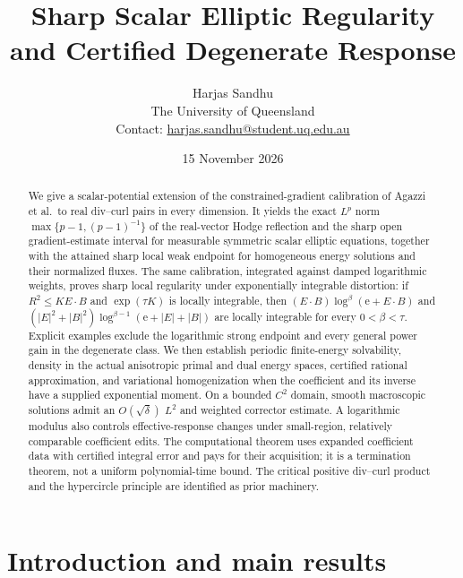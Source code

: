 \documentclass[11pt,a4paper]{article}
\numberwithin{equation}{section}
\theoremstyle{definition}
\theoremstyle{remark}\newtheorem{remark}[theorem]{Remark}
\begin{document}
\title{Sharp Scalar Elliptic Regularity\\and Certified Degenerate Response}
\author{Harjas Sandhu\\[3pt]
\small The University of Queensland\\
\small Contact:
\href{mailto:harjas.sandhu@student.uq.edu.au}{harjas.sandhu@student.uq.edu.au}}
\date{15 November 2026}
\maketitle
\begin{abstract}
We give a scalar-potential extension of the constrained-gradient calibration
of Agazzi et al.\ to real div--curl pairs in every dimension. It yields the
exact \(L^p\) norm \(\max\{p-1,(p-1)^{-1}\}\) of the real-vector Hodge
reflection and the sharp open gradient-estimate interval for measurable
symmetric scalar elliptic equations, together with the attained sharp
local weak endpoint for homogeneous energy solutions and their normalized
fluxes. The same calibration, integrated
against damped logarithmic weights, proves sharp local regularity under
exponentially integrable distortion: if \(R^2\leq K E\cdot B\) and
\(\exp(\tau K)\) is locally integrable, then
\((E\cdot B)\log^\beta(\mathrm e+E\cdot B)\) and
\((|E|^2+|B|^2)\log^{\beta-1}(\mathrm e+|E|+|B|)\)
are locally integrable for every \(0<\beta<\tau\).
Explicit examples exclude the logarithmic strong endpoint and every
general power gain in the degenerate class.
We then establish periodic finite-energy solvability, density in the actual
anisotropic primal and dual energy spaces, certified rational approximation,
and variational homogenization when the coefficient and its inverse have a
supplied exponential moment. On a bounded \(C^2\) domain, smooth
macroscopic solutions admit an \(O(\sqrt\delta)\) \(L^2\) and weighted
corrector estimate. A logarithmic modulus also controls effective-response
changes under small-region, relatively comparable coefficient edits.
The computational theorem uses expanded
coefficient data with certified integral error and pays for their acquisition;
it is a termination theorem, not a uniform polynomial-time bound.
The critical positive div--curl product and the hypercircle principle are
identified as prior machinery.
\end{abstract}
\begingroup\small
\tableofcontents
\endgroup
\clearpage

\section{Introduction and main results}
\end{document}
